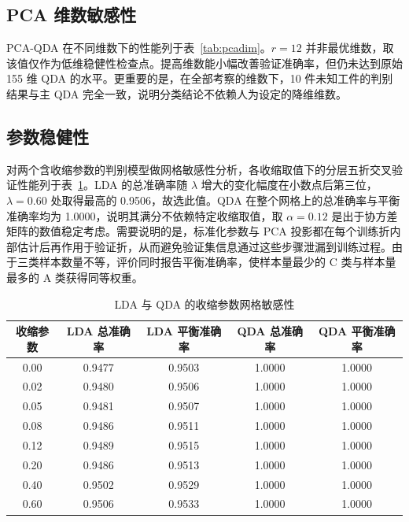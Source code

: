 \documentclass[12pt,a4paper]{article}
\newcommand{\upcite}[1]{\cite{#1}}
\begin{document}
\subsection{PCA 维数敏感性}

PCA-QDA 在不同维数下的性能列于表~\ref{tab:pcadim}。$r=12$ 并非最优维数，取该值仅作为低维稳健性检查点。提高维数能小幅改善验证准确率，但仍未达到原始 155 维 QDA 的水平。更重要的是，在全部考察的维数下，10 件未知工件的判别结果与主 QDA 完全一致，说明分类结论不依赖人为设定的降维维数。

\begin{table}[H]
\centering
\caption{PCA-QDA 在不同主成分维数下的性能}
\label{tab:pcadim}
\end{table}

\subsection{参数稳健性}

对两个含收缩参数的判别模型做网格敏感性分析，各收缩取值下的分层五折交叉验证性能列于表~\ref{tab:shrink}。LDA 的总准确率随 $\lambda$ 增大的变化幅度在小数点后第三位，$\lambda=0.60$ 处取得最高的 0.9506，故选此值。QDA 在整个网格上的总准确率与平衡准确率均为 1.0000，说明其满分不依赖特定收缩取值，取 $\alpha=0.12$ 是出于协方差矩阵的数值稳定考虑。需要说明的是，标准化参数与 PCA 投影都在每个训练折内部估计后再作用于验证折，从而避免验证集信息通过这些步骤泄漏到训练过程\upcite{cawley2010}。由于三类样本数量不等，评价同时报告平衡准确率，使样本量最少的 C 类与样本量最多的 A 类获得同等权重\upcite{brodersen2010}。

\begin{table}[H]
\centering
\caption{LDA 与 QDA 的收缩参数网格敏感性}
\label{tab:shrink}
\begin{tabular}{ccccc}
\toprule
收缩参数 & LDA 总准确率 & LDA 平衡准确率 & QDA 总准确率 & QDA 平衡准确率 \\
\midrule
0.00 & 0.9477 & 0.9503 & 1.0000 & 1.0000 \\
0.02 & 0.9480 & 0.9506 & 1.0000 & 1.0000 \\
0.05 & 0.9481 & 0.9507 & 1.0000 & 1.0000 \\
0.08 & 0.9486 & 0.9511 & 1.0000 & 1.0000 \\
0.12 & 0.9489 & 0.9515 & 1.0000 & 1.0000 \\
0.20 & 0.9486 & 0.9513 & 1.0000 & 1.0000 \\
0.40 & 0.9502 & 0.9529 & 1.0000 & 1.0000 \\
0.60 & 0.9506 & 0.9533 & 1.0000 & 1.0000 \\
\bottomrule
\end{tabular}
\end{table}
\end{document}
